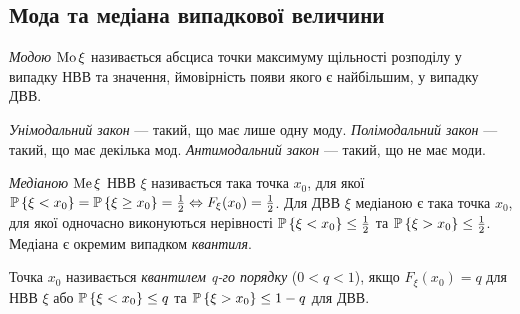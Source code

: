 \subsection{Мода та медіана випадкової величини}
\begin{definition}
    \emph{Модою} $\Mo\xi$ називається абсциса точки максимуму щільності 
    розподілу у випадку НВВ та значення, ймовірність 
    появи якого є найбільшим, у випадку ДВВ.

    \emph{Унімодальний закон} --- такий, що має лише одну моду. 
    \emph{Полімодальний закон} --- такий, що має декілька мод.
    \emph{Антимодальний закон} --- такий, що не має моди.
\end{definition}
\begin{definition}
    \emph{Медіаною} $\Me\xi$ НВВ $\xi$ називається така точка $x_0$, для якої 
    $\P\left\{\xi < x_0\right\} = \P\left\{\xi \geq x_0\right\} 
    = \frac{1}{2} \Leftrightarrow F_\xi(x_0) = \frac{1}{2}$.
    Для ДВВ $\xi$ медіаною є така точка $x_0$, для якої одночасно
    виконуються нерівності $\P\left\{\xi < x_0\right\} \leq \frac{1}{2}$ та
    $\P\left\{\xi > x_0\right\} \leq \frac{1}{2}$.
    Медіана є окремим випадком \emph{квантиля}.
\end{definition}
\begin{definition}
    Точка $x_0$ називається \emph{квантилем q-го порядку} ($0 < q < 1$), якщо $F_\xi(x_0) = q$ 
    для НВВ $\xi$ або $\P\left\{\xi < x_0\right\} \leq q$ та
    $\P\left\{\xi > x_0\right\} \leq 1-q$ 
    для ДВВ.
\end{definition}
